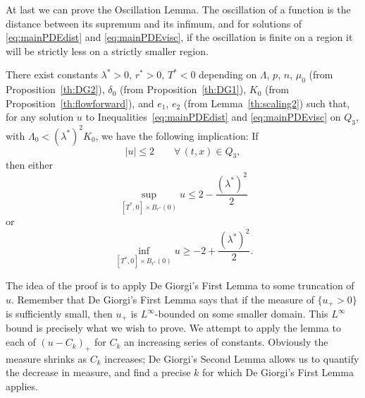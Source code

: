 At last we can prove the Oscillation Lemma.  The oscillation of a function is the distance between its supremum and its infimum, and for solutions of \eqref{eq:mainPDEdist} and \eqref{eq:mainPDEvisc}, if the oscillation is finite on a region it will be strictly less on a strictly smaller region.  

\begin{lemma} \label{th:oscillation}
There exist constants $\lambda^*>0$, $r^*>0$, $T^* < 0$ depending on $\Lambda$, $p$, $n$, $\mu_0$ (from Proposition~\ref{th:DG2}), $\delta_0$ (from Proposition~\ref{th:DG1}), $K_0$ (from Proposition~\ref{th:flowforward}), and $e_1$, $e_2$ (from Lemma~\ref{th:scaling2}) such that, for any solution $u$ to Inequalities~\eqref{eq:mainPDEdist} and \eqref{eq:mainPDEvisc} on $Q_3$, with $\Lambda_0 < (\lambda^*)^2 K_0$, we have the following implication:
If
\[ |u| \leq 2 \qquad \forall\, (t,x) \in Q_3, \]
then either
\[ \sup_{[T^*,0]\times B_{r^*}(0)} u \leq 2 - \frac{(\lambda^*)^2}{2}\]
or
\[ \inf_{[T^*,0]\times B_{r^*}(0)} u \geq -2 + \frac{(\lambda^*)^2}{2}.\]  

\end{lemma}

The idea of the proof is to apply De Giorgi's First Lemma to some truncation of $u$.  Remember that De Giorgi's First Lemma says that if the measure of $\{u_+>0\}$ is sufficiently small, then $u_+$ is $L^\infty$-bounded on some smaller domain.  This $L^\infty$ bound is precisely what we wish to prove.  We attempt to apply the lemma to each of $(u-C_k)_+$ for $C_k$ an increasing series of constants.  Obviously the measure shrinks as $C_k$ increases; De Giorgi's Second Lemma allows us to quantify the decrease in measure, and find a precise $k$ for which De Giorgi's First Lemma applies.  

